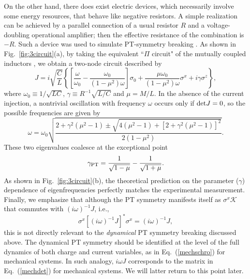 \documentclass{tADP2e}
\theoremstyle{plain}
\theoremstyle{plain}
\theoremstyle{definition}
\begin{document}
On the other hand, there does exist electric devices, which necessarily involve some energy resources, that behave like negative resistors. A simple realization can be achieved by a parallel connection of a usual resistor $R$ and a voltage-doubling operational amplifier; then the effective resistance of the combination is $-R$. Such a device was used to simulate PT-symmetry breaking \cite{SJ2011}. As shown in Fig.~\ref{fig:3circuit}(a), by taking the equivalent ``$\Pi$ circuit" of the mutually coupled inductors \cite{CKA99}, we obtain a two-node circuit described by 
\begin{equation}
J=i\sqrt{\frac{C}{L}}\left\{\left[\frac{\omega}{\omega_0}-\frac{\omega_0}{(1-\mu^2)\omega}\right]\sigma_0+\frac{\mu\omega_0}{(1-\mu^2)\omega}\sigma^x+i\gamma\sigma^z\right\},
\label{JRCL}
\end{equation}
where $\omega_0\equiv1/\sqrt{LC}$, $\gamma\equiv R^{-1}\sqrt{L/C}$ and $\mu=M/L$. In the absence of the current injection, a nontrivial oscillation with frequency $\omega$ occurs only if ${\rm det}J=0$, so the possible frequencies are given by
\begin{equation}
\omega=\omega_0\sqrt{\frac{2+\gamma^2(\mu^2-1)\pm\sqrt{4(\mu^2-1)+[2+\gamma^2(\mu^2-1)]^2}}{2(1-\mu^2)}}.
\end{equation}
These two eigenvalues coalesce at the exceptional point
\begin{equation}
\gamma_{\rm PT}=\frac{1}{\sqrt{1-\mu}}-\frac{1}{\sqrt{1+\mu}}.
\end{equation}
As shown in Fig.~\ref{fig:3circuit}(b), the theoretical prediction on the parameter ($\gamma$) dependence of eigenfrequencies perfectly matches the experimental measurement. Finally, we emphasize that although the PT symmetry manifests itself as $\sigma^x\mathcal{K}$ that commutes with $(i\omega)^{-1}J$, i.e.,
\begin{equation}
\sigma^x[(i\omega)^{-1}J]^*\sigma^x=(i\omega)^{-1}J,
\end{equation}
this is not directly relevant to the \emph{dynamical} PT symmetry breaking discussed above. The dynamical PT symmetry should be identified at the level of the full dynamics of both charge and current variables, as in  Eq.~(\ref{mechschro}) for mechanical systems. In such analogy, $i\omega J$ corresponds to the matrix in Eq.~(\ref{mechdet}) for mechanical systems. We will latter return to this point later.
\end{document}
